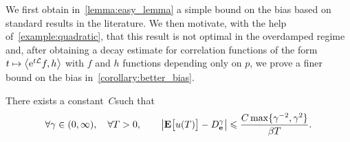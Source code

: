 \documentclass[11pt,a4paper]{article}
\begin{document}
We first obtain in~\cref{lemma:easy_lemma} a simple bound on the bias based on standard results in the literature.
We then motivate, with the help of~\cref{example:quadratic},
that this result is not optimal in the overdamped regime and,
after obtaining a decay estimate for correlation functions of the form $t \mapsto \ip{\e^{t \mathcal L} f}{h}$ with $f$ and $h$ functions depending only on $p$,
we prove a finer bound on the bias in~\cref{corollary:better_bias}.

\begin{lemma}
    \label{lemma:easy_lemma}
    There exists a constant~$C$such that
    \begin{equation}
        \label{eq:bias_simple}
        \forall \gamma \in (0, \infty),
        \quad
        \forall T > 0,
        \qquad
        \abs{\expect \bigl[u(T)\bigr] - D_{\vect e}^{\gamma}}
        \leq
        \frac{C \max \{\gamma^{-2}, \gamma^2\}}{\beta T}.
    \end{equation}
\end{lemma}
\end{document}
